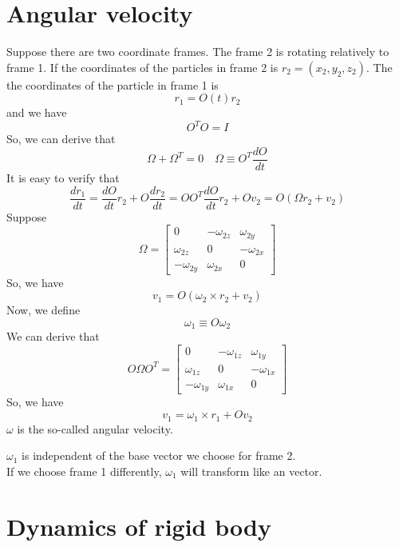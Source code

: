 \documentclass[cyan]{elegantnote}
\begin{document}
\section{Angular velocity}
Suppose there are two coordinate frames. The frame 2 is rotating relatively to frame 1. If the coordinates of the particles in frame 2 is $r_2=(x_2,y_2,z_2)$.
The the coordinates of the particle in frame 1 is
\[r_1 = O(t)r_2\]
and we have
\[O^TO=I\]
So, we can derive that
\[\Omega + \Omega^T= 0 \quad \Omega \equiv O^T\frac{dO}{dt}\]
It is easy to verify that
\[\frac{dr_1}{dt} = \frac{dO}{dt}r_2 + O\frac{dr_2}{dt} = OO^T \frac{dO}{dt}r_2 + Ov_2  = O (\Omega r_2 + v_2)\]
Suppose
\[\Omega = \left[ \begin{matrix} 0& -\omega_{2z}& \omega_{2y}\\ \omega_{2z}& 0& -\omega_{2x}\\ -\omega_{2y}& \omega_{2x}& 0\end{matrix} \right] \]
So, we have
\[v_1 = O(\omega_2 \times r_2 + v_2) \]
Now, we define
\[\omega_1 \equiv O\omega_2\]
We can derive that
\[O \Omega O^T = \left[ \begin{matrix} 0& -\omega_{1z}& \omega_{1y}\\ \omega_{1z}& 0& -\omega_{1x}\\ -\omega_{1y}& \omega_{1x}& 0\end{matrix} \right] \]
So, we have
\[v_1 = \omega_1 \times r_1 + Ov_2\]
$\omega$ is the so-called angular velocity.
\begin{note}
$\omega_1$ is independent of the base vector we choose for frame 2.\\
If we choose frame 1 differently, $\omega_1$ will transform like an vector.
\end{note}

\section{Dynamics of rigid body}
\end{document}
